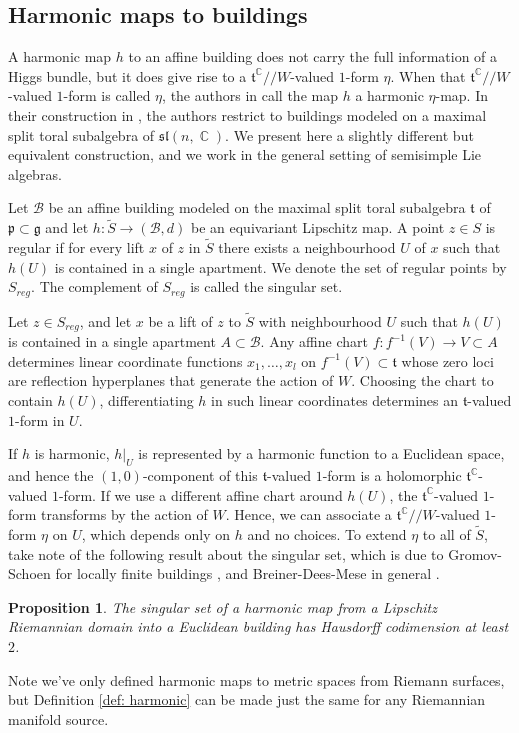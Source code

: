 \documentclass[10pt]{amsart}
\newcommand{\p}{\mathfrak{p}}
\newcommand{\g}{\mathfrak{g}}
\newcommand{\ft}{\mathfrak{t}}
\newtheorem{prop}[thm]{Proposition}
\theoremstyle{definition}
\DeclareMathOperator{\C}{\mathbb{C}}
\begin{document}
\subsection{Harmonic maps to buildings}\label{sec: harmonic to building}
A harmonic map $h$ to an affine building does not carry the full information of a Higgs bundle, but it does give rise to a $\ft^{\C}//W$-valued $1$-form $\eta$. When that $\ft^{\C}//W$-valued $1$-form is called $\eta$, the authors in \cite{KNPS} call the map $h$ a harmonic $\eta$-map.  In their construction in \cite[section 3]{KNPS}, the authors restrict to buildings modeled on a maximal split toral subalgebra of $\mathfrak{sl}(n,\C).$ We present here a slightly different but equivalent construction, and we work in the general setting of semisimple Lie algebras.

Let $\mathcal{B}$ be an affine building modeled on the maximal split toral subalgebra $\ft$ of $\p\subset \g$ and let $h:\tilde{S}\to (\mathcal{B},d)$ be an equivariant Lipschitz map. A point $z\in S$ is regular if for every lift $x$ of $z$ in $\tilde{S}$ there exists a neighbourhood $U$ of $x$ such that $h(U)$ is contained in a single apartment. We denote the set of regular points by $S_{reg}.$ The complement of $S_{reg}$ is called the singular set. 

Let $z\in S_{reg}$, and let $x$ be a lift of $z$ to $\tilde{S}$ with neighbourhood $U$ such that $h(U)$ is contained in a single apartment $A\subset \mathcal{B}$. Any affine chart $f: f^{-1}(V)\to V\subset A$ determines linear coordinate functions $x_1,\dots, x_l$ on $f^{-1}(V)\subset \ft$ whose zero loci are reflection hyperplanes that generate the action of $W$. Choosing the chart to contain $h(U)$, differentiating $h$ in such linear coordinates determines an $\ft$-valued $1$-form in $U$.

If $h$ is harmonic, $h|_U$ is represented by a harmonic function to a Euclidean space, and hence the $(1,0)$-component of this $\ft$-valued $1$-form is a holomorphic $\ft^{\C}$-valued $1$-form. If we use a different affine chart around $h(U)$, the $\ft^{\C}$-valued $1$-form transforms by the action of $W$. Hence, we can associate a $\ft^{\C}//W$-valued $1$-form $\eta$ on $U$, which depends only on $h$ and no choices. To extend $\eta$ to all of $\tilde{S}$, take note of the following result about the singular set, which is due to Gromov-Schoen for locally finite buildings \cite[Theorem 6.4]{GSb}, and Breiner-Dees-Mese in general \cite[Theorem 1.1]{BDM}. 
\begin{prop}\label{prop: singular set}
     The singular set of a harmonic map from a Lipschitz Riemannian domain into a Euclidean building has Hausdorff codimension at least $2$.
\end{prop}
Note we've only defined harmonic maps to metric spaces from Riemann surfaces, but Definition \ref{def: harmonic} can be made just the same for any Riemannian manifold source. 
\end{document}
